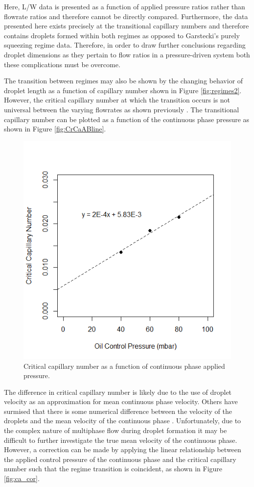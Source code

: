 Here, L/W data is presented as a function of applied pressure ratios rather than flowrate ratios and therefore cannot be directly compared. Furthermore, the data presented here exists precisely at the transitional capillary numbers and therefore contains droplets formed within both regimes as opposed to Garstecki's purely squeezing regime data. Therefore, in order to draw further conclusions regarding droplet dimensions as they pertain to flow ratios in a pressure-driven system both these complications must be overcome. 

The transition between regimes may also be shown by the changing behavior of droplet length as a function of capillary number shown in Figure \vref{fig:regimes2}. However, the critical capillary number at which the transition occurs is not universal between the varying flowrates as shown previously \cite{DeMenech2008}. The transitional capillary number can be plotted as a function of the continuous phase pressure as shown in Figure \vref{fig:CrCaABline}.

\begin{figure}[H]
\centering 
\includegraphics[width=0.75\columnwidth]{CrCaABline.PNG} 
\caption[Critical capillary number as a function of continuous phase applied pressure]{Critical capillary number as a function of continuous phase applied pressure.} 
\label{fig:CrCaABline} 
\end{figure}

The difference in critical capillary number is likely due to the use of droplet velocity as an approximation for mean continuous phase velocity. Others have surmised that there is some numerical difference between the velocity of the droplets and the mean velocity of the continuous phase \cite{Ward2005}. Unfortunately, due to the complex nature of multiphase flow during droplet formation it may be difficult to further investigate the true mean velocity of the continuous phase. However, a correction can be made by applying the linear relationship between the applied control pressure of the continuous phase and the critical capillary number such that the regime transition is coincident, as shown in Figure \vref{fig:ca_cor}. 

